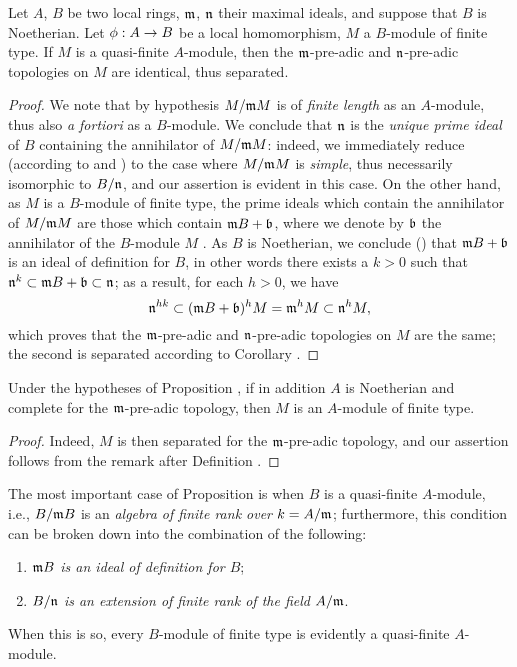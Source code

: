 \begin{prop}[7.4.2]
\label{0.7.4.2}
Let $A$, $B$ be two local rings, $\mathfrak{m}$, $\mathfrak{n}$ their maximal ideals, and
suppose that $B$ is Noetherian. Let $\phi:A\to B$ be a local homomorphism, $M$ a $B$-module
of finite type. If $M$ is a quasi-finite $A$-module, then the $\mathfrak{m}$-pre-adic and
$\mathfrak{n}$-pre-adic topologies on $M$ are identical, thus separated.
\end{prop}

\begin{proof}
\label{proof-0.7.4.2}
We note that by hypothesis $M/\mathfrak{m}M$ is of {\em finite length} as an $A$-module,
thus also {\em a fortiori} as a $B$-module. We conclude that $\mathfrak{n}$ is the
{\em unique prime ideal} of $B$ containing the annihilator of $M/\mathfrak{m}M$: indeed, we
immediately reduce (according to  and
) to the case where $M/\mathfrak{m}M$ is {\em simple}, thus
necessarily isomorphic to $B/\mathfrak{n}$, and our assertion is evident in this case. On
the other hand, as $M$ is a $B$-module of finite type, the prime ideals which contain the
annihilator of $M/\mathfrak{m}M$ are those which contain $\mathfrak{m}B+\mathfrak{b}$, where
we denote by $\mathfrak{b}$ the annihilator of the $B$-module $M$
. As $B$ is Noetherian, we conclude
(\cite[p.~127, Cor.~4]{I-11}) that $\mathfrak{m}B+\mathfrak{b}$ is an ideal
of definition for $B$, in other words there exists a $k>0$ such that
$\mathfrak{n}^k\subset\mathfrak{m}B+\mathfrak{b}\subset\mathfrak{n}$; as a result, for each
$h>0$, we have
\[
  \mathfrak{n}^{hk}\subset(\mathfrak{m}B+\mathfrak{b})^h M
  =\mathfrak{m}^h M\subset\mathfrak{n}^h M,
\]
which proves that the $\mathfrak{m}$-pre-adic and $\mathfrak{n}$-pre-adic topologies on $M$
are the same; the second is separated according to Corollary .
\end{proof}

\begin{cor}[7.4.3]
\label{0.7.4.3}
Under the hypotheses of Proposition , if in addition $A$ is
Noetherian and complete for the $\mathfrak{m}$-pre-adic topology, then $M$ is an $A$-module
of finite type.
\end{cor}

\begin{proof}
\label{proof-0.7.4.3}
Indeed, $M$ is then separated for the $\mathfrak{m}$-pre-adic topology, and our assertion
follows from the remark after Definition .
\end{proof}

\begin{env}[7.4.4]
\label{0.7.4.4}
The most important case of Proposition  is when $B$ is a
quasi-finite $A$-module, i.e., $B/\mathfrak{m}B$ is an {\em algebra of finite rank over
$k=A/\mathfrak{m}$}; furthermore, this condition can be broken down into the combination
of the following:
\begin{enumerate}[label=(\roman*)]
  \item {\em $\mathfrak{m}B$ is an ideal of definition for $B$};
  \item {\em $B/\mathfrak{n}$ is an extension of finite rank of the field $A/\mathfrak{m}$}.
\end{enumerate}
When this is so, every $B$-module of finite type is evidently a quasi-finite $A$-module.
\end{env}


